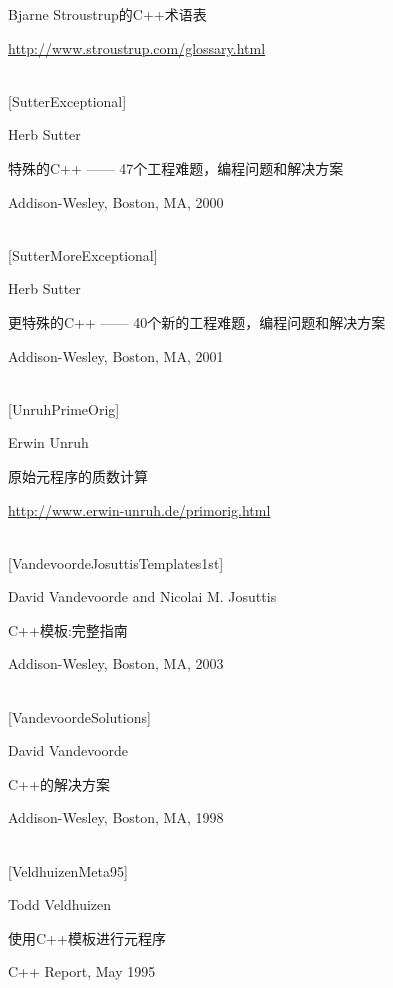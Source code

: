 Bjarne Stroustrup的C++术语表

\url{http://www.stroustrup.com/glossary.html}

\hspace*{\fill} \\ %
{[SutterExceptional]}

Herb Sutter

特殊的C++ —— 47个工程难题，编程问题和解决方案

Addison-Wesley, Boston, MA, 2000

\hspace*{\fill} \\ %
{[SutterMoreExceptional]}

Herb Sutter

更特殊的C++ —— 40个新的工程难题，编程问题和解决方案

Addison-Wesley, Boston, MA, 2001

\hspace*{\fill} \\ %
{[UnruhPrimeOrig]}

Erwin Unruh

原始元程序的质数计算

\url{http://www.erwin-unruh.de/primorig.html}

\hspace*{\fill} \\ %
{[VandevoordeJosuttisTemplates1st]}

David Vandevoorde and Nicolai M. Josuttis

C++模板:完整指南

Addison-Wesley, Boston, MA, 2003

\hspace*{\fill} \\ %
{[VandevoordeSolutions]}

David Vandevoorde

C++的解决方案

Addison-Wesley, Boston, MA, 1998

\hspace*{\fill} \\ %
{[VeldhuizenMeta95]}

Todd Veldhuizen

使用C++模板进行元程序

C++ Report, May 1995























